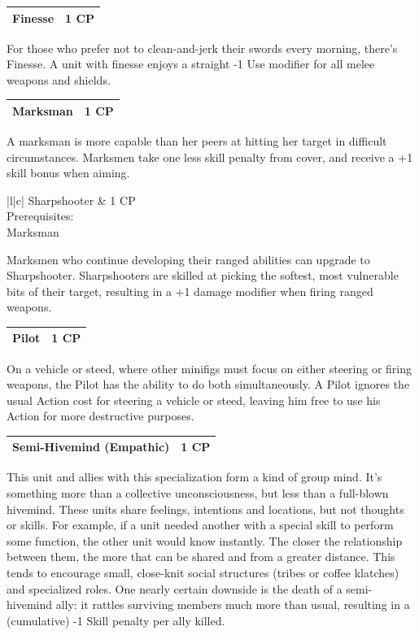 \documentclass[12pt,a4paper,twocolumn]{article}
\begin{document}
\begin{tabular}{|l|c|} \hline
Finesse & 1 CP \\ \hline
\end{tabular}

For those who prefer not to clean-and-jerk their swords every morning, there's Finesse.  A unit with finesse enjoys a straight -1 Use modifier for all melee weapons and shields.

\begin{tabular}{|l|c|} \hline
Marksman & 1 CP \\ \hline
\end{tabular}

A marksman is more capable than her peers at hitting her target in difficult circumstances.  Marksmen take one less skill penalty from cover, and receive a +1 skill bonus when aiming.

\begin{tabular}{|l|c|} \hline
Sharpshooter & 1 CP \\ \hline
{} {Prerequisites: } \\
 {Marksman } \\ \hline
\end{tabular}

Marksmen who continue developing their ranged abilities can upgrade to Sharpshooter.  Sharpshooters are skilled at picking the softest, most vulnerable bits of their target, resulting in a +1 damage modifier when firing ranged weapons.

\begin{tabular}{|l|c|} \hline
Pilot & 1 CP \\ \hline
\end{tabular}

On a vehicle or steed, where other minifigs must focus on either steering or firing weapons, the Pilot has the ability to do both simultaneously.  A Pilot ignores the usual Action cost for steering a vehicle or steed, leaving him free to use his Action for more destructive purposes.


\begin{tabular}{|l|c|} \hline
Semi-Hivemind (Empathic) & 1 CP \\ \hline
\end{tabular}

This unit and allies with this specialization form a kind of group mind.  It's something more than a collective unconsciousness, but less than a full-blown hivemind.  These units share feelings, intentions and locations, but not thoughts or skills.  For example, if a unit needed another with a special skill to perform some function, the other unit would know instantly.  The closer the relationship between them, the more that can be shared and from a greater distance.  This tends to encourage small, close-knit social structures (tribes or coffee klatches) and specialized roles.  One nearly certain downside is the death of a semi-hivemind ally: it rattles surviving members much more than usual, resulting in a (cumulative) -1 Skill penalty per ally killed.
\end{document}
